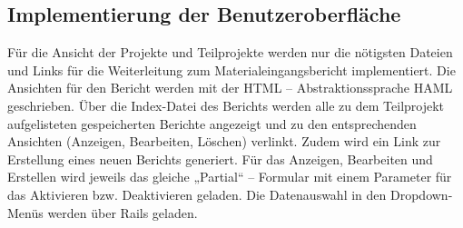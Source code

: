 \subsection{Implementierung der Benutzeroberfläche}
Für die Ansicht der Projekte und Teilprojekte werden nur die nötigsten Dateien und Links für die Weiterleitung zum Materialeingangsbericht implementiert. Die Ansichten für den Bericht werden mit der HTML – Abstraktionssprache HAML geschrieben. Über die Index-Datei des Berichts werden alle zu dem Teilprojekt aufgelisteten gespeicherten Berichte angezeigt und zu den entsprechenden Ansichten (Anzeigen, Bearbeiten, Löschen) verlinkt. Zudem wird ein Link zur Erstellung eines neuen Berichts generiert. Für das Anzeigen, Bearbeiten und Erstellen wird jeweils das gleiche „Partial“ – Formular mit einem Parameter für das Aktivieren bzw. Deaktivieren geladen. Die Datenauswahl in den Dropdown-Menüs werden über Rails geladen.

